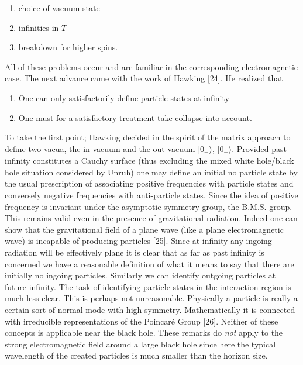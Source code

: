 \begin{enumerate}
\item choice of vacuum state
\item infinities in $T$
\item breakdown for higher spins.
\end{enumerate}
All of these problems occur and are familiar in the corresponding electromagnetic
case. The next advance came with the work of Hawking [24]. He realized that
\begin{enumerate}
\item One can only satisfactorily define particle states at infinity

\item One must for a satisfactory treatment take collapse
into account.
\end{enumerate}
To take the first point; Hawking decided in the spirit of the matrix
approach to define two vacua, the in vacuum and the out vacuum $\vert 0_{-} \rangle$, $\vert 0_+ \rangle$.
Provided past infinity constitutes a Cauchy surface (thus excluding the mixed white
hole/black hole situation considered by Unruh) one may define an initial no
particle state by the usual prescription of associating positive frequencies
with particle states and conversely negative frequencies with anti-particle states.
Since the idea of positive frequency is invariant under the asymptotic symmetry group, the B.M.S.
group. This remains valid even in the presence of gravitational radiation. 
Indeed one can show that the gravitational field of a plane wave (like a plane electromagnetic wave)
is incapable of producing particles [25]. Since at infinity any ingoing radiation will be effectively plane it is clear that as far
as past infinity is concerned we have a reasonable definition of what it means to
say that there are initially no ingoing particles. Similarly we can identify outgoing particles
at future infinity. The task of identifying particle states in the interaction region is much less clear.
This is perhaps not unreasonable. Physically a particle is really a certain sort
of normal mode with high symmetry. Mathematically it is connected with irreducible
representations of the Poincar\'e Group [26]. Neither of these concepts is applicable near the black hole.
These remarks do {\it not} apply to the strong electromagnetic field around a large black hole since
here the typical wavelength of the created particles is much smaller than the horizon size.

